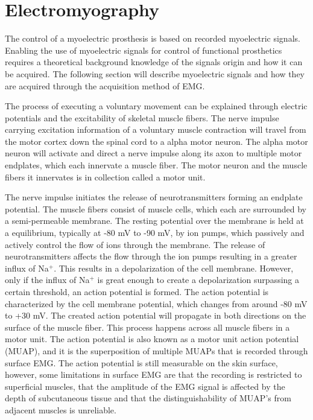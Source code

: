 \section{Electromyography}

The control of a myoelectric prosthesis is based on recorded myoelectric signals. \cite{Geethanjali2016}  Enabling the use of myoelectric signals for control of functional prosthetics requires a theoretical background knowledge of the signals origin and how it can be acquired. The following section will describe myoelectric signals and how they are acquired through the acquisition method of EMG.   

The process of executing a voluntary movement can be explained through electric potentials and the excitability of skeletal muscle fibers. The nerve impulse carrying excitation information of a voluntary muscle contraction will travel from the motor cortex down the spinal cord to a alpha motor neuron. The alpha motor neuron will activate and direct a nerve impulse along its axon to multiple motor endplates, which each innervate a muscle fiber. The motor neuron and the muscle fibers it innervates is in collection called a motor unit. \cite{Turker2013} 

The nerve impulse initiates the release of neurotransmitters forming an endplate potential. The muscle fibers consist of muscle cells, which each are surrounded by a semi-permeable membrane. The resting potential over the membrane is held at a equilibrium, typically at -80 mV to -90 mV, by ion pumps, which passively and actively control the flow of ions through the membrane. The release of neurotransmitters affects the flow through the ion pumps resulting in a greater influx of Na$^+$. This results in a depolarization of the cell membrane. However, only if the influx of Na$^+$ is great enough to create a depolarization surpassing a certain threshold, an action potential is formed. The action potential is characterized by the cell membrane potential, which changes from around -80 mV to +30 mV. %
The created action potential will propagate in both directions on the surface of the muscle fiber. This process happens across all muscle fibers in a motor unit. The action potential is also known as a motor unit action potential (MUAP), and it is the superposition of multiple MUAPs that is recorded through surface EMG. The action potential is still measurable on the skin surface, however, some limitations in surface EMG are that the recording is restricted to superficial muscles, that the amplitude of the EMG signal is affected by the depth of subcutaneous tissue and that the distinguishability of MUAP's from adjacent muscles is unreliable. \cite{Turker2013,Martini2012} 

